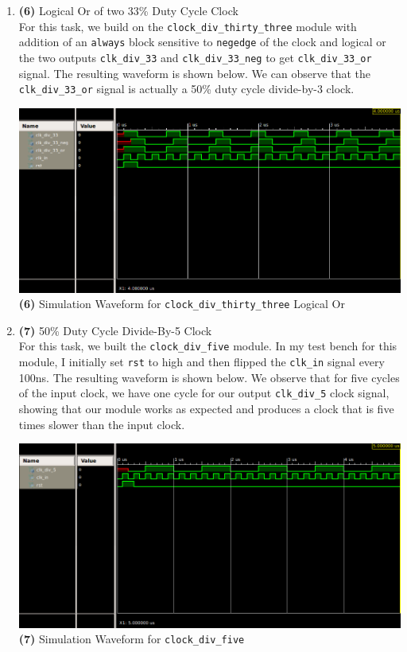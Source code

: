 \documentclass{article}
\begin{document}
\begin{enumerate}
    \item \textbf{(6)} Logical Or of two 33\% Duty Cycle Clock  \\
    For this task, we build on the \texttt{clock\_div\_thirty\_three} module with addition of an \texttt{always} block sensitive to \texttt{negedge} of the clock and logical or the two outputs \texttt{clk\_div\_33} and \texttt{clk\_div\_33\_neg} to get \texttt{clk\_div\_33\_or} signal. The resulting waveform is shown below. We can observe that the \texttt{clk\_div\_33\_or} signal is actually a 50\% duty cycle divide-by-3 clock.
    \begin{center}
        \includegraphics[scale=0.4]{waveform-6.png} \\
        \caption{\textbf{(6)} Simulation Waveform for \texttt{clock\_div\_thirty\_three} Logical Or}
    \end{center}
    
    \item \textbf{(7)} 50\% Duty Cycle Divide-By-5 Clock  \\
    For this task, we built the \texttt{clock\_div\_five} module. In my test bench for this module, I initially set \texttt{rst} to high and then flipped the \texttt{clk\_in} signal every 100ns. The resulting waveform is shown below. We observe that for five cycles of the input clock, we have one cycle for our output \texttt{clk\_div\_5} clock signal, showing that our module works as expected and produces a clock that is five times slower than the input clock.
    \begin{center}
        \includegraphics[scale=0.4]{waveform-7.png} \\
        \caption{\textbf{(7)} Simulation Waveform for \texttt{clock\_div\_five}}
    \end{center}
    

\end{enumerate}
\end{document}
